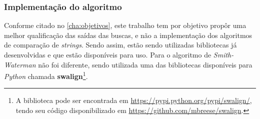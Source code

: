 \subsubsection{Implementação do algoritmo} %
\label{sub:implementa_o_do_algoritmo}

Conforme citado no \autoref{cha:objetivos}, este trabalho tem por objetivo propôr uma melhor qualificação das saídas das buscas, e não a implementação dos algoritmos de comparação de \textit{strings}. Sendo assim, estão sendo utilizadas bibliotecas já desenvolvidas e que estão  disponíveis para uso. Para o algoritmo de \textit{Smith-Waterman} não foi diferente, sendo utilizada uma das bibliotecas disponíveis para \textit{Python} chamada \textbf{swalign}\footnote{A biblioteca pode ser encontrada em \url{https://pypi.python.org/pypi/swalign/}, tendo seu código disponibilizado em \url{https://github.com/mbreese/swalign}.}.

